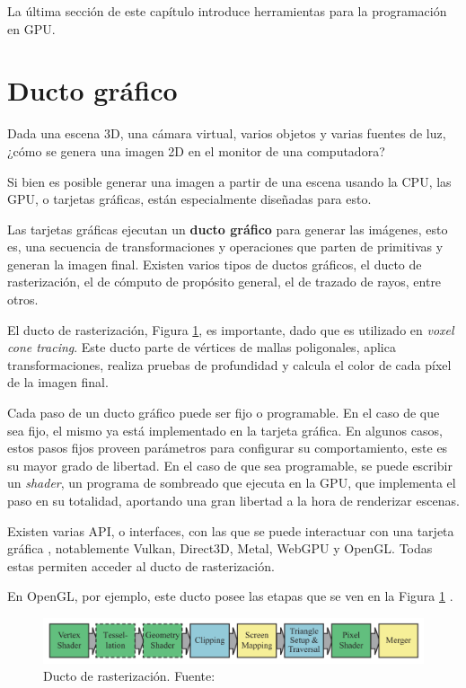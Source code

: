 La última sección de este capítulo introduce herramientas para la programación en GPU.

\section{Ducto gráfico}\label{sec:graphics-pipeline}

Dada una escena 3D, una cámara virtual, varios objetos y varias fuentes de luz, ¿cómo se genera una imagen 2D en el monitor de una computadora?

Si bien es posible generar una imagen a partir de una escena usando la CPU, las GPU, o tarjetas gráficas, están especialmente diseñadas para esto.

Las tarjetas gráficas ejecutan un \textbf{ducto gráfico} para generar las imágenes, esto es, una secuencia de transformaciones y operaciones que parten de primitivas y generan la imagen final.
Existen varios tipos de ductos gráficos, el ducto de rasterización, el de cómputo de propósito general, el de trazado de rayos, entre otros.

El ducto de rasterización, Figura \ref{fig:raster-pipeline}, es importante, dado que es utilizado en \textit{voxel cone tracing}.
Este ducto parte de vértices de mallas poligonales, aplica transformaciones, realiza pruebas de profundidad y calcula el color de cada píxel de la imagen final.

Cada paso de un ducto gráfico puede ser fijo o programable.
En el caso de que sea fijo, el mismo ya está implementado en la tarjeta gráfica.
En algunos casos, estos pasos fijos proveen parámetros para configurar su comportamiento, este es su mayor grado de libertad.
En el caso de que sea programable, se puede escribir un \textit{shader}, un programa de sombreado que ejecuta en la GPU, que implementa el paso en su totalidad, aportando una gran libertad a la hora de renderizar escenas.

Existen varias API, o interfaces, con las que se puede interactuar con una tarjeta gráfica \cite{comparison-graphics-apis}, notablemente Vulkan, Direct3D, Metal, WebGPU y OpenGL.
Todas estas permiten acceder al ducto de rasterización.

En OpenGL, por ejemplo, este ducto posee las etapas que se ven en la Figura \ref{fig:raster-pipeline} \cite{rtr}.

\begin{figure}[h!]
    \centering
    \includegraphics[width=\textwidth]{raster-pipeline.png}
    \caption{Ducto de rasterización. Fuente: \cite{rtr}}
    \label{fig:raster-pipeline}
\end{figure}

